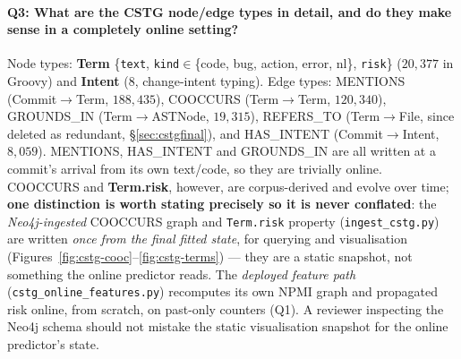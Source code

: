 \documentclass[11pt,a4paper]{article}
\newcommand{\code}[1]{\texttt{#1}}
\newcommand{\node}[1]{\textcolor{kgblue}{\textbf{#1}}}
\newcommand{\edge}[1]{\textsc{#1}}
\begin{document}
	\paragraph{Q3: What are the CSTG node/edge types in detail, and do they make
	sense in a completely online setting?} Node types: \node{Term}
	\{\code{text}, \code{kind}$\in$\{code, bug, action, error, nl\}, \code{risk}\}
	($20{,}377$ in Groovy) and \node{Intent} ($8$, change-intent typing). Edge types:
	\edge{MENTIONS} (Commit$\rightarrow$Term, $188{,}435$), \edge{COOCCURS}
	(Term$\rightarrow$Term, $120{,}340$), \edge{GROUNDS\_IN} (Term$\rightarrow$ASTNode,
	$19{,}315$), \edge{REFERS\_TO} (Term$\rightarrow$File, since deleted as redundant,
	\S\ref{sec:cstgfinal}), and \edge{HAS\_INTENT} (Commit$\rightarrow$Intent,
	$8{,}059$). \edge{MENTIONS}, \edge{HAS\_INTENT} and \edge{GROUNDS\_IN} are all
	written at a commit's arrival from its own text/code, so they are trivially
	online. \edge{COOCCURS} and \node{Term.risk}, however, are corpus-derived and
	evolve over time; \textbf{one distinction is worth stating precisely so it is
	never conflated}: the \emph{Neo4j-ingested} \edge{COOCCURS} graph and
	\code{Term.risk} property (\code{ingest\_cstg.py}) are written \emph{once from
	the final fitted state}, for querying and visualisation
	(Figures~\ref{fig:cstg-cooc}--\ref{fig:cstg-terms}) --- they are a static snapshot,
	not something the online predictor reads. The \emph{deployed feature path}
	(\code{cstg\_online\_features.py}) recomputes its own NPMI graph and propagated
	risk online, from scratch, on past-only counters (Q1). A reviewer inspecting the
	Neo4j schema should not mistake the static visualisation snapshot for the online
	predictor's state.
\end{document}
